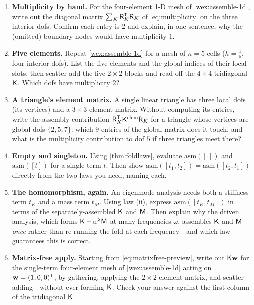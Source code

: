 \exercisessection
\begin{enumerate}[nosep]
  \item \textbf{Multiplicity by hand.} For the four-element 1-D mesh of
  \cref{wex:assemble-1d}, write out the diagonal matrix $\sum_K
  \mathsf{R}_K^{\mathsf T}\mathsf{R}_K$ of \cref{eq:multiplicity} on the three interior
  dofs. Confirm each entry is $2$ and explain, in one sentence, why the (omitted)
  boundary nodes would have multiplicity $1$.

  \item \textbf{Five elements.} Repeat \cref{wex:assemble-1d} for a mesh of $n=5$
  cells ($h=\tfrac15$, four interior dofs). List the five elements and the global
  indices of their local slots, then scatter-add the five $2\times2$ blocks and
  read off the $4\times4$ tridiagonal $\mathsf{K}$. Which dofs have multiplicity $2$?

  \item \textbf{A triangle's element matrix.} A single linear triangle has three
  local dofs (its vertices) and a $3\times3$ element matrix. Without computing its
  entries, write the assembly contribution $\mathsf{R}_K^{\mathsf
  T}\mathsf{K}^{\mathrm{elem}}\mathsf{R}_K$ for a triangle whose vertices are global dofs
  $\{2,5,7\}$: which $9$ entries of the global matrix does it touch, and what is
  the multiplicity contribution to dof $5$ if three triangles meet there?

  \item \textbf{Empty and singleton.} Using \cref{thm:foldlaws}, evaluate
  $\mathrm{asm}([\,])$ and $\mathrm{asm}([t])$ for a single term $t$. Then show
  $\mathrm{asm}([t_1,t_2])=\mathrm{asm}([t_2,t_1])$ directly from the two laws you
  need, naming each.

  \item \textbf{The homomorphism, again.} An eigenmode analysis needs both a
  stiffness term $t_K$ and a mass term $t_M$. Using law (ii), express
  $\mathrm{asm}([t_K,t_M])$ in terms of the separately-assembled $\mathsf{K}$ and
  $\mathsf{M}$. Then explain why the driven analysis, which forms
  $\mathsf{K}-\omega^2\mathsf{M}$ at many frequencies $\omega$, assembles $\mathsf{K}$ and
  $\mathsf{M}$ \emph{once} rather than re-running the fold at each frequency---and
  which law guarantees this is correct.

  \item \textbf{Matrix-free apply.} Starting from \cref{eq:matrixfree-preview},
  write out $\mathsf{K}\mathbf{w}$ for the single-term four-element mesh of
  \cref{wex:assemble-1d} acting on $\mathbf{w}=(1,0,0)^{\mathsf T}$, by gathering,
  applying the $2\times2$ element matrix, and scatter-adding---without ever forming
  $\mathsf{K}$. Check your answer against the first column of the tridiagonal
  $\mathsf{K}$.


\end{enumerate}
